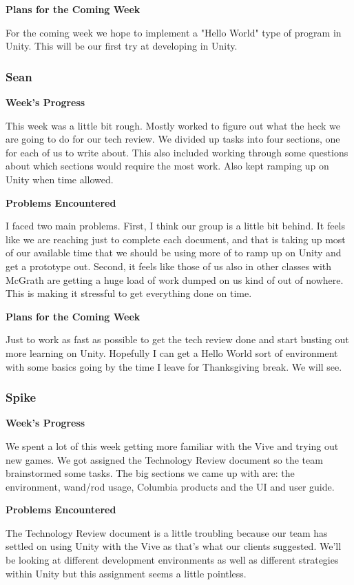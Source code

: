 \documentclass[10pt,journal,compsoc,onecolumn, draftclsnofoot]{IEEEtran}
\begin{document}
\noindent \textbf{Plans for the Coming Week}

For the coming week we hope to implement a "Hello World" type of program in Unity. This will be our first try at developing in Unity.

\subsubsection{Sean}
\noindent \textbf{Week's Progress}

This week was a little bit rough.  Mostly worked to figure out what the heck we are going to do for our tech review.  We divided up tasks into four sections, one for each of us to write about.  This also included working through some questions about which sections would require the most work.  Also kept ramping up on Unity when time allowed.

\noindent \textbf{Problems Encountered}

I faced two main problems.  First, I think our group is a little bit behind.  It feels like we are reaching just to complete each document, and that is taking up most of our available time that we should be using more of to ramp up on Unity and get a prototype out.  Second, it feels like those of us also in other classes with McGrath are getting a huge load of work dumped on us kind of out of nowhere.  This is making it stressful to get everything done on time.

\noindent \textbf{Plans for the Coming Week}

Just to work as fast as possible to get the tech review done and start busting out more learning on Unity.  Hopefully I can get a Hello World sort of environment with some basics going by the time I leave for Thanksgiving break.  We will see.

\subsubsection{Spike}
\noindent \textbf{Week's Progress}

We spent a lot of this week getting more familiar with the Vive and trying out new games. We got assigned the Technology Review document so the team brainstormed some tasks. The big sections we came up with are: the environment, wand/rod usage, Columbia products and the UI and user guide.

\noindent \textbf{Problems Encountered}

The Technology Review document is a little troubling because our team has settled on using Unity with the Vive as that's what our clients suggested. We'll be looking at different development environments as well as different strategies within Unity but this assignment seems a little pointless.
\end{document}
